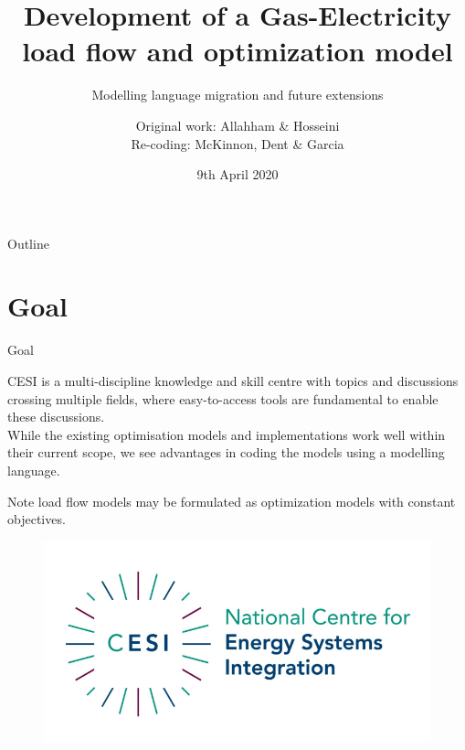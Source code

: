 \documentclass[handout]{beamer}
\title[Development of a Coordinated Gas-Electricity optimisation model]{\normalsize{Development of a Gas-Electricity load flow and optimization model}}
\subtitle{\small{Modelling language migration and future extensions}}
\author{\texorpdfstring{Original work: }{}Allahham \& Hosseini \texorpdfstring{\\Re-coding: }{}McKinnon, Dent \& Garcia}
\institute{National Centre for Energy System Integration (CESI)}
\date{9th April 2020}
\begin{document}
\begin{frame}
  \titlepage
\end{frame}

\begin{frame}{Outline}
  \tableofcontents
\end{frame}


\section{Goal}

\begin{frame}[t]{Goal}

  CESI is a multi-discipline knowledge and skill centre with topics and discussions crossing multiple fields, where easy-to-access tools are fundamental to enable these discussions.\\[12pt]

  While the existing optimisation models and implementations work well within their current scope, we see advantages in coding the models using a modelling language.
  
  Note load flow models may be formulated as optimization models with constant objectives.

  \begin{figure}
  \begin{center}
  \includegraphics[width=.55\textwidth]{CESI.png}
  \end{center}
  \end{figure}

\end{frame}


\end{document}
